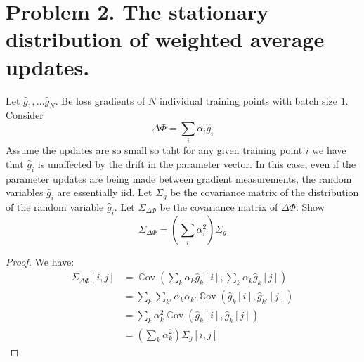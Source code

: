 \documentclass{amsart}
\newcommand{\Cov}[1]{\operatorname{\mathbb{C}ov}\left(#1\right)}
\theoremstyle{definition}
\begin{document}
\section*{Problem 2. The stationary distribution of weighted average updates. }
Let $\hat{g}_1, \ldots \hat{g}_N$. Be loss gradients of $N$ individual training points with batch size $1$. 
Consider 
\[
\Delta \Phi = \sum_{i} \alpha_i \hat{g}_i
\]
Assume the updates are so small so taht for any given training point $i$ we have that $\hat{g}_i$ is unaffected by the drift in the parameter vector.
In this case, even if the parameter updates are being made between gradient measurements, the random variables $\hat{g}_i$ are essentially iid. 
Let $\Sigma_g$ be the covariance matrix of the distribution of the random variable $\hat{g}_i$. 
Let $\Sigma_{\Delta \Phi}$ be the covariance matrix of $\Delta \Phi$. 
Show
\[
\Sigma_{\Delta\Phi} = \left(
\sum_{i} \alpha_i^2
\right) \Sigma_g
\]
\begin{proof}
  We have:
  \begin{align*}
    \Sigma_{\Delta\Phi}[i,j] &= \Cov{\sum_{k} \alpha_k \hat{g}_k[i], \sum_{k} \alpha_k \hat{g}_k[j]} \\
    &= \sum_{k} \sum_{k'} \alpha_k \alpha_{k'} \Cov{\hat{g}_k[i], \hat{g}_{k'}[j]} \\
    &= \sum_{k} \alpha_k^2 \Cov{\hat{g}_k[i], \hat{g}_k[j]} \\
    &= \left(\sum_{k} \alpha_k^2\right) \Sigma_g[i,j]
  \end{align*}
\end{proof}
\end{document}
